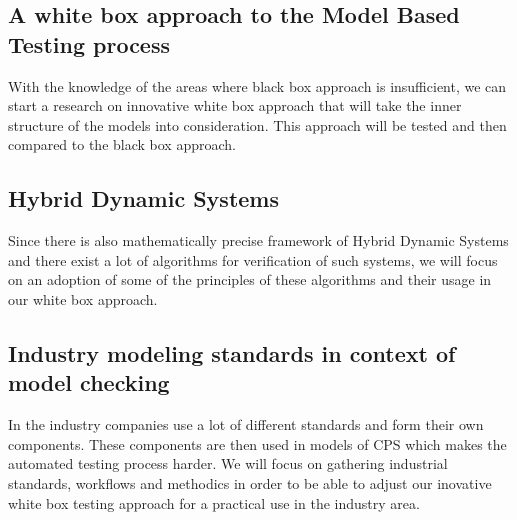 \subsection{A white box approach to the Model Based Testing process}
With the knowledge of the areas where black box approach is insufficient, we can start a research on innovative white box approach that will take the inner structure of the models into consideration. This approach will be tested and then compared to the black box approach.

\subsection{Hybrid Dynamic Systems}
Since there is also mathematically precise framework of Hybrid Dynamic Systems \cite{Shaft:HybridDynamicalSystems} and there exist a lot of algorithms for verification of such systems, we will focus on an adoption of some of the principles of these algorithms and their usage in our white box approach.

\subsection{Industry modeling standards in context of model checking}
In the industry companies use a lot of different standards and form their own components. These components are then used in models of CPS which makes the automated testing process harder. We will focus on gathering industrial standards, workflows and methodics in order to be able to adjust our inovative white box testing approach for a practical use in the industry area.